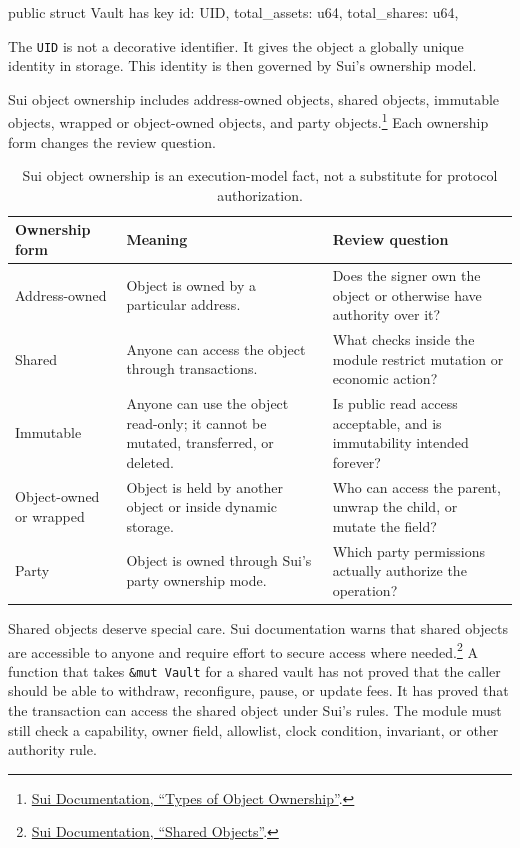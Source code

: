 \begin{codeblock}
public struct Vault has key {
    id: UID,
    total_assets: u64,
    total_shares: u64,
}
\end{codeblock}

The \texttt{UID} is not a decorative identifier. It gives the object a globally unique identity in storage. This identity is then governed by Sui's ownership model.

Sui object ownership includes address-owned objects, shared objects, immutable objects, wrapped or object-owned objects, and party objects.\footnote{\href{https://docs.sui.io/develop/objects/object-ownership/}{Sui Documentation, ``Types of Object Ownership''}.} Each ownership form changes the review question.

\begin{table}[htbp]
\centering
\small
\renewcommand{\arraystretch}{1.18}
\begin{tabularx}{\textwidth}{@{}>{\RaggedRight\arraybackslash}p{}>{\RaggedRight\arraybackslash}p{}X@{}}
\toprule
Ownership form & Meaning & Review question \\
\midrule
Address-owned & Object is owned by a particular address. & Does the signer own the object or otherwise have authority over it? \\
Shared & Anyone can access the object through transactions. & What checks inside the module restrict mutation or economic action? \\
Immutable & Anyone can use the object read-only; it cannot be mutated, transferred, or deleted. & Is public read access acceptable, and is immutability intended forever? \\
Object-owned or wrapped & Object is held by another object or inside dynamic storage. & Who can access the parent, unwrap the child, or mutate the field? \\
Party & Object is owned through Sui's party ownership mode. & Which party permissions actually authorize the operation? \\
\bottomrule
\end{tabularx}
\caption{Sui object ownership is an execution-model fact, not a substitute for protocol authorization.}
\end{table}

Shared objects deserve special care. Sui documentation warns that shared objects are accessible to anyone and require effort to secure access where needed.\footnote{\href{https://docs.sui.io/develop/objects/object-ownership/shared}{Sui Documentation, ``Shared Objects''}.} A function that takes \texttt{\&mut Vault} for a shared vault has not proved that the caller should be able to withdraw, reconfigure, pause, or update fees. It has proved that the transaction can access the shared object under Sui's rules. The module must still check a capability, owner field, allowlist, clock condition, invariant, or other authority rule.

